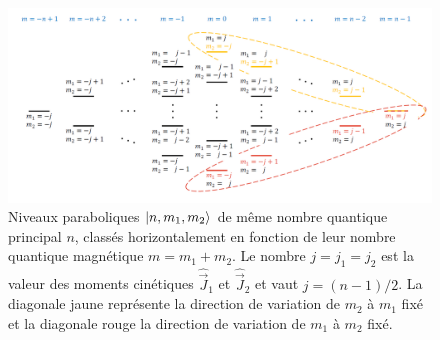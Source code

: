 \begin{figure}[!h]
\centering
\includegraphics[width=1.\linewidth]{figures/echelle_parabolique_m1m2}
\caption[Échelle des niveaux paraboliques $\ket{n,m_1,m_2}$]{
Niveaux paraboliques $\ket{n,m_1,m_2}$ de même nombre quantique principal $n$, classés horizontalement en fonction de leur nombre quantique magnétique $m=m_1+m_2$. Le nombre $j=j_1=j_2$ est la valeur des moments cinétiques $\hat{\vec{J}}_1$ et $\hat{\vec{J}}_2$ et vaut $j=(n-1)/2$.
La diagonale jaune représente la direction de variation de $m_2$ à $m_1$ fixé et la diagonale rouge la direction de variation de $m_1$ à $m_2$ fixé.
}
\label{fig:parab_m1m2}
\end{figure}



